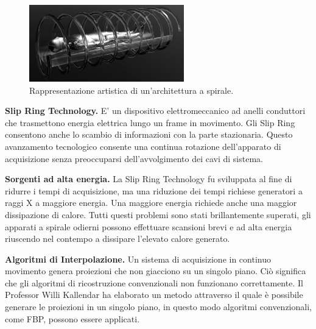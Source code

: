 \documentclass[a4paper,12pt, doubleside]{report}
\begin{document}
                    \begin{figure}[h]
                        \centering
                        \includegraphics[width=0.6\textwidth]{helical}
                        \caption{Rappresentazione artistica di un'architettura a spirale.}
                        \label{fig:spirale}
                    \end{figure}
                    
                    \bigskip
                    \textbf{Slip Ring Technology.} E' un dispositivo elettromeccanico ad anelli conduttori che trasmettono energia elettrica lungo un frame in movimento. Gli Slip Ring consentono anche lo scambio di informazioni con la parte stazionaria. Questo avanzamento tecnologico consente una continua rotazione dell'apparato di acquisizione senza preoccuparsi dell'avvolgimento dei cavi di sistema.
                    
                    \bigskip
                    \textbf{Sorgenti ad alta energia.} La Slip Ring Technology fu sviluppata al fine di ridurre i tempi di acquisizione, ma una riduzione dei tempi richiese generatori a raggi X a maggiore energia. Una maggiore energia richiede anche una maggior dissipazione di calore. Tutti questi problemi sono stati brillantemente superati, gli apparati a spirale odierni possono effettuare scansioni brevi e ad alta energia riuscendo nel contempo a dissipare l'elevato calore generato.
                    
                    \bigskip
                    \textbf{Algoritmi di Interpolazione.} Un sistema di acquisizione in continuo movimento genera proiezioni che non giacciono su un singolo piano. Ciò significa che gli algoritmi di ricostruzione convenzionali non funzionano correttamente. Il Professor Willi Kallendar ha elaborato un metodo attraverso il quale è possibile generare le proiezioni in un singolo piano, in questo modo algoritmi convenzionali, come FBP, possono essere applicati. 
                    
\end{document}
